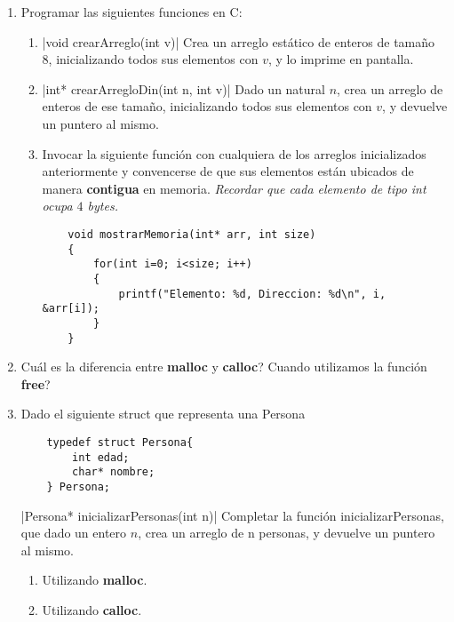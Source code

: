 \documentclass[titlepage,oneside]{book}
\begin{document}
\begin{enumerate}
\begin{verbatim}
           (*px)++;
    
           printf("%d \n", px);
           printf("%d \n", (*px));
        }
    \end{verbatim}

    \item Programar las siguientes funciones en C:
    \begin{enumerate}
        \item{}|void crearArreglo(int v)|
        Crea un arreglo estático de enteros de tamaño 8, inicializando todos sus elementos con $v$, y lo imprime en pantalla.
        
        \item{}|int* crearArregloDin(int n, int v)|
        Dado un natural $n$, crea un arreglo de enteros de ese tamaño, inicializando todos sus elementos con $v$, y devuelve un puntero al mismo.
        
        \item Invocar la siguiente función con cualquiera de los arreglos inicializados anteriormente y convencerse de que sus elementos están ubicados de manera \textbf{contigua} en memoria. \textit{Recordar que cada elemento de tipo int ocupa $4$ bytes.}
        
    \begin{verbatim}
    void mostrarMemoria(int* arr, int size)
    {
        for(int i=0; i<size; i++)
        {
            printf("Elemento: %d, Direccion: %d\n", i, &arr[i]);
        }
    }
    \end{verbatim}    
    
    \end{enumerate}

    \item{Cuál es la diferencia entre {\textbf{malloc}} y {\textbf{calloc}}? Cuando utilizamos la función {\textbf{free}}?}

    \item Dado el siguiente struct que representa una Persona
    \begin{verbatim}
    typedef struct Persona{
        int edad;
        char* nombre;
    } Persona;
    \end{verbatim} 

    |Persona* inicializarPersonas(int n)|
    Completar la función inicializarPersonas, que dado un entero $n$, crea un arreglo de n personas, y devuelve un puntero al mismo. 
    \begin{enumerate}
        \item Utilizando \textbf{malloc}.
        \item Utilizando \textbf{calloc}.
    \end{enumerate}
    


\end{enumerate}
\end{document}
